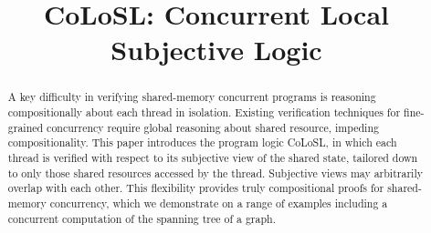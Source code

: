 \documentclass[preprint]{sigplanconf}
\begin{document}
\setlength{\pdfpageheight}{\paperheight}
\setlength{\pdfpagewidth}{\paperwidth}






\title{CoLoSL: Concurrent Local Subjective Logic}
\subtitle{}

\authorinfo\null\null\null

\maketitle

\begin{abstract}
A key difficulty in verifying shared-memory concurrent programs is
reasoning compositionally about each thread in isolation. Existing
verification techniques for fine-grained concurrency require global
reasoning about shared resource, impeding compositionality.  This
paper introduces the program logic CoLoSL, in which each thread is
verified with respect to its subjective view of the shared state,
tailored down to only those shared resources accessed by the
thread. Subjective views may arbitrarily overlap with each other.
This flexibility provides truly compositional proofs for shared-memory
concurrency, which we demonstrate on a range of examples including a
concurrent computation of the spanning tree of a graph.
\end{abstract}


\end{document}
